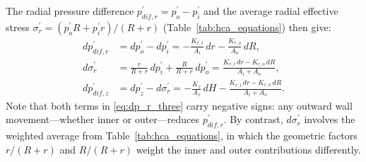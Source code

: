 The radial pressure difference $p_{dif,r}^{\prime}=p_o^{\prime}-p_i^{\prime}$ and the average radial effective stress $\sigma_r^{\prime}=({p_o^{\prime}R+p_i^{\prime}r})/({R+r})$ (Table~\ref{tab:hca_equations}) then give:
\begin{align}
dp_{dif,r}^{\prime}
  &= dp_o^{\prime}-dp_i^{\prime}
   = -\frac{K_{r,i}}{A_i}\,dr - \frac{K_{r,o}}{A_o}\,dR, \label{eq:dp_r_three}\\[6pt]
d\sigma_r^{\prime}
  &= \frac{r}{R+r}\,dp_i^{\prime} + \frac{R}{R+r}\,dp_o^{\prime}
   = \frac{K_{r,i}\,dr - K_{r,o}\,dR}{A_i+A_o}, \label{eq:dsigma_r_three}\\[6pt]
dp_{dif,z}^{\prime}
  &= dp_z^{\prime}-d\sigma_r^{\prime}
   = -\frac{K_z}{A_z}\,dH - \frac{K_{r,i}\,dr - K_{r,o}\,dR}{A_i+A_o}. \label{eq:dp_z_three}
\end{align}
Note that both terms in \cref{eq:dp_r_three} carry negative signs: any outward wall movement---whether inner or outer---reduces $p_{dif,r}^{\prime}$. By contrast, $d\sigma_r^{\prime}$ involves the weighted average from Table~\ref{tab:hca_equations}, in which the geometric factors $r/(R+r)$ and $R/(R+r)$ weight the inner and outer contributions differently.

